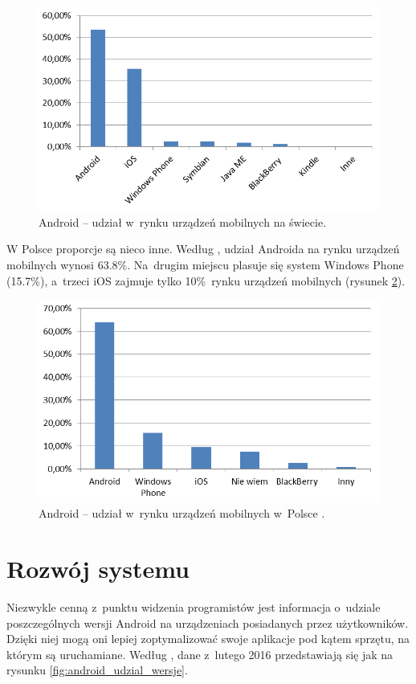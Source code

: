\newpage
\begin{figure}[!htb]
    \centering
    \includegraphics[width=12cm]{imgs/ch2_android_udzial_2pl.png}
    \caption
{Android – udział w~rynku urządzeń mobilnych na świecie\cite{website:android:stat2}.}
    \label{fig:android_udzial_zagranica}
\end{figure} 

W Polsce proporcje są nieco inne. Według \cite{website:android:stat1}, udział Androida na rynku urządzeń mobilnych wynosi 63.8\%. Na~drugim miejscu plasuje się system Windows Phone (15.7\%), a~trzeci iOS zajmuje tylko 10\%~rynku urządzeń mobilnych (rysunek \ref{fig:android_udzial_polska}).

\begin{figure}[!htb]
    \centering
    \includegraphics[width=12cm]{imgs/ch2_android_udzial_1pl.png}
    \caption
{Android – udział w~rynku urządzeń mobilnych w~Polsce \cite{website:android:stat1}.}
    \label{fig:android_udzial_polska}
\end{figure} 

\newpage

\section{Rozwój systemu}
Niezwykle cenną z~punktu widzenia programistów jest informacja o~udziale poszczególnych wersji Android na urządzeniach posiadanych przez użytkowników. Dzięki niej mogą oni lepiej zoptymalizować swoje aplikacje pod kątem sprzętu, na którym są uruchamiane. Według  \cite{website:android:spidersweb}, dane z~lutego 2016 przedstawiają się jak na rysunku \ref{fig:android_udzial_wersje}.

